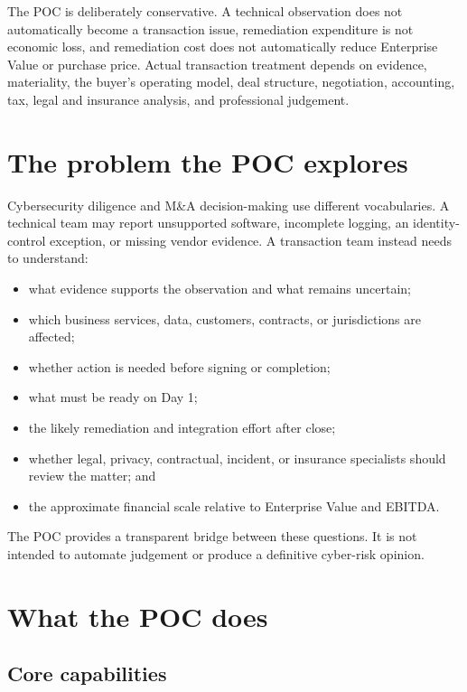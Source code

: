 \documentclass[11pt,a4paper]{article}
\begin{document}
The POC is deliberately conservative. A technical observation does not automatically become a transaction issue, remediation expenditure is not economic loss, and remediation cost does not automatically reduce Enterprise Value or purchase price. Actual transaction treatment depends on evidence, materiality, the buyer's operating model, deal structure, negotiation, accounting, tax, legal and insurance analysis, and professional judgement.

\section{The problem the POC explores}

Cybersecurity diligence and M\&A decision-making use different vocabularies. A technical team may report unsupported software, incomplete logging, an identity-control exception, or missing vendor evidence. A transaction team instead needs to understand:

\begin{itemize}
  \item what evidence supports the observation and what remains uncertain;
  \item which business services, data, customers, contracts, or jurisdictions are affected;
  \item whether action is needed before signing or completion;
  \item what must be ready on Day 1;
  \item the likely remediation and integration effort after close;
  \item whether legal, privacy, contractual, incident, or insurance specialists should review the matter; and
  \item the approximate financial scale relative to Enterprise Value and EBITDA.
\end{itemize}

The POC provides a transparent bridge between these questions. It is not intended to automate judgement or produce a definitive cyber-risk opinion.

\section{What the POC does}

\subsection{Core capabilities}
\end{document}
